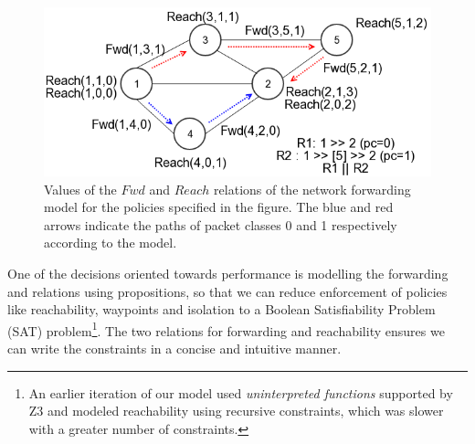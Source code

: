 \begin{figure}[!th]
	\centering
	\includegraphics[width=\columnwidth]{figures/network-model-example.png}
	\caption{Values of the $Fwd$ and $Reach$ relations of the network forwarding model
		 for the policies specified in the figure. The blue and red arrows indicate the 
		 paths of packet classes 0 and 1 respectively according to the model.}
	\label{fig:model}
\end{figure}

One of the decisions oriented towards performance is modelling the forwarding and relations using propositions, so that we can reduce enforcement of policies like reachability, waypoints and isolation to a Boolean Satisfiability Problem (SAT) problem\footnote{An earlier iteration of our model used \emph{uninterpreted functions} supported by Z3 and modeled reachability using recursive constraints, 
	which was slower with a greater number of constraints.}. 
The two relations for forwarding and reachability ensures we can write the constraints in a concise and intuitive manner.

